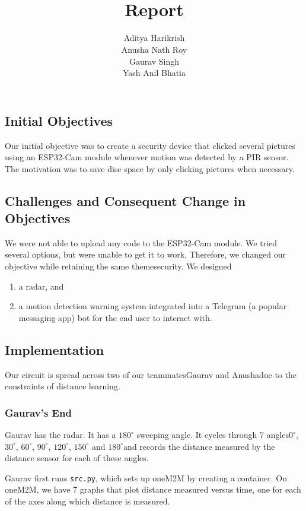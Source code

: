 \documentclass[12pt, a4paper]{article}
\title{\uwave{Project Surveillance}\\Report}
\author{Aditya Harikrish\\Anusha Nath Roy\\Gaurav Singh\\Yash Anil Bhatia}
\date{}
\theoremstyle{definition}
\theoremstyle{remark}
\begin{document}
\maketitle

\subsection*{Initial Objectives}
Our initial objective was to create a security device that clicked several pictures using an ESP32-Cam module whenever motion was detected by a PIR sensor. The motivation was to save disc space by only clicking pictures when necessary.

\subsection*{Challenges and Consequent Change in Objectives}
We were not able to upload any code to the ESP32-Cam module. We tried several options, but were unable to get it to work. Therefore, we changed our objective while retaining the same theme\textemdash security. We designed
\begin{enumerate}
    \item a radar, and
    \item a motion detection warning system integrated into a Telegram (a popular messaging app) bot for the end user to interact with.
\end{enumerate}

\subsection*{Implementation}
Our circuit is spread across two of our teammates\textemdash Gaurav and Anusha\textemdash due to the constraints of distance learning.

\subsubsection*{Gaurav's End}
Gaurav has the radar. It has a $180^\circ$ sweeping angle. It cycles through 7 angles\textemdash $0^\circ$, $30^\circ$, $60^\circ$, $90^\circ$, $120^\circ$, $150^\circ$ and $180^\circ$\textemdash and records the distance measured by the distance sensor for each of these angles.

Gaurav first runs \texttt{src.py}, which sets up oneM2M by creating a container. On oneM2M, we have 7 graphs that plot distance measured versus time, one for each of the axes along which distance is measured.
\end{document}
